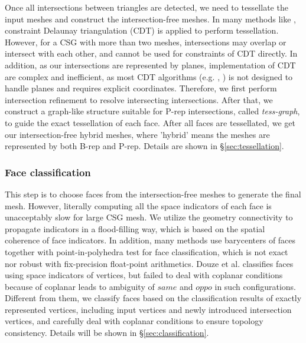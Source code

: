 \documentclass[10pt,journal,compsoc]{IEEEtran}
\begin{document}
Once all intersections between triangles are detected, we need to tessellate the input meshes and construct the intersection-free meshes. In many methods like \cite{ogayar2015deferred}, constraint Delaunay triangulation (CDT) is applied to perform tessellation. However, for a CSG with more than two meshes, intersections may overlap or intersect with each other, and cannot be used for constraints of CDT directly. In addition, as our intersections are represented by planes, implementation of CDT are complex and inefficient, as most CDT algorithms (e.g. \cite{chew1989constrained}, \cite{de1992line}) is not designed to handle planes and requires explicit coordinates. Therefore, we first perform intersection refinement to resolve intersecting intersections. After that, we construct a graph-like structure suitable for P-rep intersections, called \emph{tess-graph}, to guide the exact tessellation of each face. After all faces are tessellated, we get our intersection-free hybrid meshes, where 'hybrid' means the meshes are represented by both B-rep and P-rep. Details are shown in \S\ref{sec:tessellation}.

\subsubsection{Face classification}

This step is to choose faces from the intersection-free meshes to generate the final mesh. However, literally computing all the space indicators of each face is unacceptably slow for large CSG mesh. We utilize the geometry connectivity to propagate indicators in a flood-filling way, which is based on the spatial coherence of face indicators. In addition, many methods use barycenters of faces together with point-in-polyhedra test for face classification, which is not exact nor robust with fix-precision float-point arithmetics. Douze et al. \cite{douze2015quickcsg} classifies faces using space indicators of vertices, but failed to deal with coplanar conditions because of coplanar leads to ambiguity of $same$ and $oppo$ in such configurations. Different from them, we classify faces based on the classification results of exactly represented vertices, including input vertices and newly introduced intersection vertices, and carefully deal with coplanar conditions to ensure topology consistency. Details will be shown in \S\ref{sec:classification}.
\end{document}
